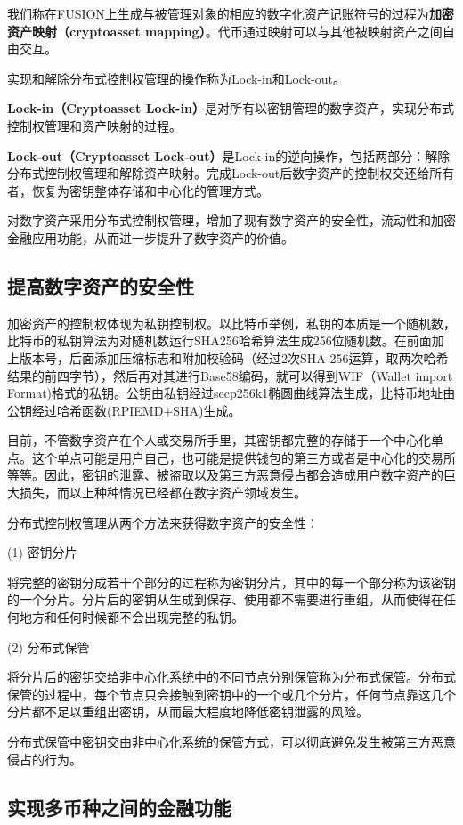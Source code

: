\documentclass[a4paper,12pt]{article}
\begin{document}
我们称在FUSION上生成与被管理对象的相应的数字化资产记账符号的过程为{\bfseries{加密资产映射（cryptoasset mapping）}}。代币通过映射可以与其他被映射资产之间自由交互。

实现和解除分布式控制权管理的操作称为Lock-in和Lock-out。

\textbf{Lock-in（Cryptoasset Lock-in）}是对所有以密钥管理的数字资产，实现分布式控制权管理和资产映射的过程。

\textbf{Lock-out（Cryptoasset Lock-out）}是Lock-in的逆向操作，包括两部分：解除分布式控制权管理和解除资产映射。完成Lock-out后数字资产的控制权交还给所有者，恢复为密钥整体存储和中心化的管理方式。

对数字资产采用分布式控制权管理，增加了现有数字资产的安全性，流动性和加密金融应用功能，从而进一步提升了数字资产的价值。

\subsection{提高数字资产的安全性}
加密资产的控制权体现为私钥控制权。以比特币\citep{Satoshi2008}举例，私钥的本质是一个随机数，比特币的私钥算法为对随机数运行SHA256哈希算法生成256位随机数。在前面加上版本号，后面添加压缩标志和附加校验码（经过2次SHA-256运算，取两次哈希结果的前四字节），然后再对其进行Base58编码，就可以得到WIF（Wallet import Format)格式的私钥。公钥由私钥经过secp256k1椭圆曲线算法生成，比特币地址由公钥经过哈希函数(RPIEMD+SHA)生成。

目前，不管数字资产在个人或交易所手里，其密钥都完整的存储于一个中心化单点。这个单点可能是用户自己，也可能是提供钱包的第三方或者是中心化的交易所等等。因此，密钥的泄露、被盗取以及第三方恶意侵占都会造成用户数字资产的巨大损失，而以上种种情况已经都在数字资产领域发生。

分布式控制权管理从两个方法来获得数字资产的安全性：

(1) 密钥分片

将完整的密钥分成若干个部分的过程称为密钥分片，其中的每一个部分称为该密钥的一个分片。分片后的密钥从生成到保存、使用都不需要进行重组，从而使得在任何地方和任何时候都不会出现完整的私钥。

(2) 分布式保管

将分片后的密钥交给非中心化系统中的不同节点分别保管称为分布式保管。分布式保管的过程中，每个节点只会接触到密钥中的一个或几个分片，任何节点靠这几个分片都不足以重组出密钥，从而最大程度地降低密钥泄露的风险。

分布式保管中密钥交由非中心化系统的保管方式，可以彻底避免发生被第三方恶意侵占的行为。

\subsection{实现多币种之间的金融功能}
\end{document}
